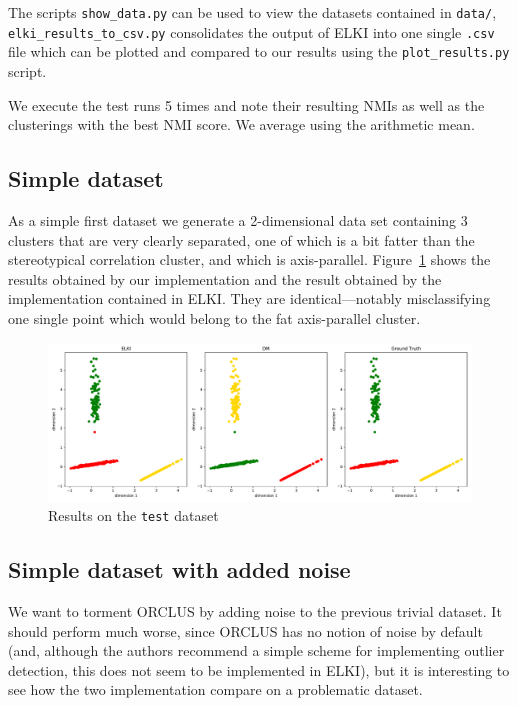 \documentclass[english]{scrartcl}
\begin{document}
The scripts \texttt{show\_data.py} can be used to view the datasets contained in \texttt{data/},
\texttt{elki\_results\_to\_csv.py} consolidates the output of ELKI into one single \texttt{.csv}
file which can be plotted and compared to our results using the \texttt{plot\_results.py} script.

We execute the test runs 5 times and note their resulting NMIs as well as the clusterings with the
best NMI score. We average using the arithmetic mean.

\subsection{Simple dataset}

As a simple first dataset we generate a 2-dimensional data set containing 3 clusters that are very clearly
separated, one of which is a bit fatter than the stereotypical correlation cluster, and which is
axis-parallel. Figure~\ref{fig:test} shows the results obtained by our implementation
and the result obtained by the implementation contained in ELKI. They are identical---notably misclassifying one
single point which would belong to the fat axis-parallel cluster.

\begin{figure}[tb]
    \centering
    \includegraphics[width=\textwidth]{img/test_cmp}
    \caption{Results on the \texttt{test} dataset}
    \label{fig:test}
\end{figure}

\subsection{Simple dataset with added noise}

We want to torment ORCLUS by adding noise to the previous trivial dataset.
It should perform much worse, since ORCLUS has no notion of noise by default
(and, although the authors recommend a simple scheme for implementing outlier
detection, this does not seem to be implemented in ELKI), but it is interesting
to see how the two implementation compare on a problematic dataset.
\end{document}
